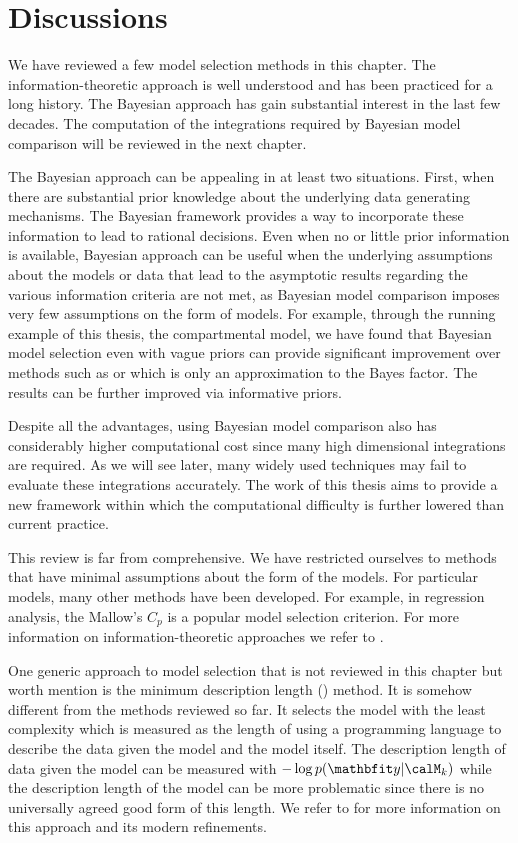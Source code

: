 \section{Discussions}
\label{sec:Model Selection Discussion}

We have reviewed a few model selection methods in this chapter. The
information-theoretic approach is well understood and has been practiced for
a long history. The Bayesian approach has gain substantial interest in the
last few decades. The computation of the integrations required by Bayesian
model comparison will be reviewed in the next chapter.

The Bayesian approach can be appealing in at least two situations. First,
when there are substantial prior knowledge about the underlying data
generating mechanisms. The Bayesian framework provides a way to incorporate
these information to lead to rational decisions. Even when no or little prior
information is available, Bayesian approach can be useful when the
underlying assumptions about the models or data that lead to the asymptotic
results regarding the various information criteria are not met, as Bayesian
model comparison imposes very few assumptions on the form of models. For
example, through the running example of this thesis, the \pet compartmental
model, we have found that Bayesian model selection even with vague priors can
provide significant improvement over methods such as \aicc or \bic which is
only an approximation to the Bayes factor. The results can be further
improved via informative priors.

Despite all the advantages, using Bayesian model comparison also has
considerably higher computational cost since many high dimensional
integrations are required. As we will see later, many widely used techniques
may fail to evaluate these integrations accurately. The work of this thesis
aims to provide a new framework within which the computational difficulty is
further lowered than current practice.

This review is far from comprehensive. We have restricted ourselves to methods
that have minimal assumptions about the form of the models. For particular
models, many other methods have been developed. For example, in regression
analysis, the Mallow's $C_p$ is a popular model selection criterion. For more
information on information-theoretic approaches we refer to
\cite{Burnham:2002wc,Claeskens:2008tq}.

One generic approach to model selection that is not reviewed in this chapter
but worth mention is the minimum description length (\mdl) method. It is
somehow different from the methods reviewed so far. It selects the model with
the least complexity which is measured as the length of using a programming
language to describe the data given the model and the model itself. The
description length of data given the model can be measured with $-\log
p(\data|\calM_k)$ while the description length of the model can be more
problematic since there is no universally agreed good form of this length. We
refer to \cite{Grunwald:2005vx} for more information on this approach and its
modern refinements.

